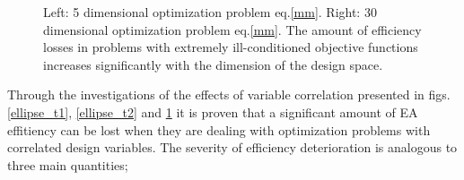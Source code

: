\begin{figure}[h!]
\begin{minipage}[b]{0.5\linewidth}
 \centering
\end{minipage}
\begin{minipage}[b]{0.5\linewidth}
 \centering
\end{minipage}
\caption{Left: 5 dimensional optimization problem eq.\ref{mm}. Right: 30 dimensional optimization problem eq.\ref{mm}. The amount of efficiency losses in problems with extremely ill-conditioned objective functions increases significantly with the dimension of the design space.} 
\label{multimodres}
\end{figure}

Through the investigations of the effects of variable correlation presented in figs. \ref{ellipse_t1}, \ref{ellipse_t2} and \ref{multimodres} it is proven that a significant amount of EA effitiency can be lost when they are dealing with optimization problems with correlated design variables. The severity of efficiency deterioration is analogous to three main quantities;

